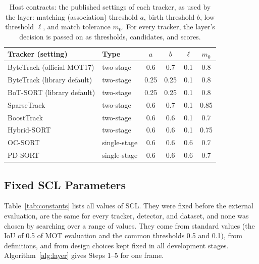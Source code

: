 \documentclass[pdflatex,sn-mathphys-num,iicol]{sn-jnl}
\newcommand{\scl}{SCL}
\begin{document}
\begin{table}[!tb]
\caption{Host contracts: the published settings of each tracker, as used by the layer: matching
(association) threshold $a$, birth threshold $b$, low threshold $\ell$, and match tolerance $m_0$.
For every tracker, the layer's decision is passed on as thresholds, candidates, and scores.}
\label{tab:contracts}
\centering\footnotesize
\setlength{\tabcolsep}{4pt}
\begin{tabular}{@{}>{\raggedright\arraybackslash}p{27mm}lcccc@{}}
\toprule
Tracker (setting) & Type & $a$ & $b$ & $\ell$ & $m_0$\\
\midrule
ByteTrack (official MOT17) & two-stage & 0.6 & 0.7 & 0.1 & 0.8\\
ByteTrack (library default) & two-stage & 0.25 & 0.25 & 0.1 & 0.8\\
BoT-SORT (library default) & two-stage & 0.25 & 0.25 & 0.1 & 0.8\\
SparseTrack & two-stage & 0.6 & 0.7 & 0.1 & 0.85\\
BoostTrack & two-stage & 0.6 & 0.6 & 0.1 & 0.7\\
Hybrid-SORT & two-stage & 0.6 & 0.6 & 0.1 & 0.75\\
OC-SORT & single-stage & 0.6 & 0.6 & 0.6 & 0.7\\
PD-SORT & single-stage & 0.6 & 0.6 & 0.6 & 0.7\\
\bottomrule
\end{tabular}
\end{table}

\subsection{Fixed SCL Parameters}\label{sec:constants}
Table~\ref{tab:constants} lists all values of \scl{}. They were fixed before the external
evaluation, are the same for every tracker, detector, and dataset, and none was chosen by searching
over a range of values. They come from standard values (the IoU of 0.5 of MOT evaluation and the
common thresholds 0.5 and 0.1), from definitions, and from design choices kept fixed in all
development stages. Algorithm~\ref{alg:layer} gives Steps 1--5 for one frame.
\end{document}
